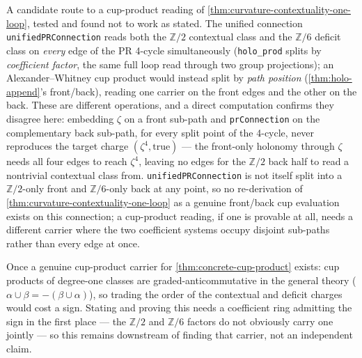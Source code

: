 \begin{theorem}\label{thm:concrete-cup-product}\notready{}
A candidate route to a cup-product reading of \cref{thm:curvature-contextuality-one-loop}, tested
and found not to work as stated. The unified connection \texttt{unifiedPRConnection} reads both
the $\mathbb{Z}/2$ contextual class and the $\mathbb{Z}/6$ deficit class on \emph{every} edge of
the PR 4-cycle simultaneously (\texttt{holo\_prod} splits by \emph{coefficient factor}, the same
full loop read through two group projections); an Alexander--Whitney cup product would instead
split by \emph{path position} (\cref{thm:holo-append}'s front/back), reading one carrier on the
front edges and the other on the back. These are different operations, and a direct computation
confirms they disagree here: embedding $\zeta$ on a front sub-path and \texttt{prConnection} on
the complementary back sub-path, for every split point of the 4-cycle, never reproduces the target
charge $(\zeta^4,\mathrm{true})$ --- the front-only holonomy through $\zeta$ needs all four edges
to reach $\zeta^4$, leaving no edges for the $\mathbb{Z}/2$ back half to read a nontrivial
contextual class from. \texttt{unifiedPRConnection} is not itself split into a
$\mathbb{Z}/2$-only front and $\mathbb{Z}/6$-only back at any point, so no re-derivation of
\cref{thm:curvature-contextuality-one-loop} as a genuine front/back cup evaluation exists on this
connection; a cup-product reading, if one is provable at all, needs a different carrier where the
two coefficient systems occupy disjoint sub-paths rather than every edge at once.
\end{theorem}

\begin{theorem}\label{thm:exchange-graded-commutativity}\notready{}
Once a genuine cup-product carrier for \cref{thm:concrete-cup-product} exists: cup products of
degree-one classes are graded-anticommutative in the general theory
($\alpha\cup\beta = -(\beta\cup\alpha)$), so trading the order of the contextual and deficit
charges would cost a sign. Stating and proving this needs a coefficient ring admitting the sign
in the first place --- the $\mathbb{Z}/2$ and $\mathbb{Z}/6$ factors do not obviously carry one
jointly --- so this remains downstream of finding that carrier, not an independent claim.
\end{theorem}

